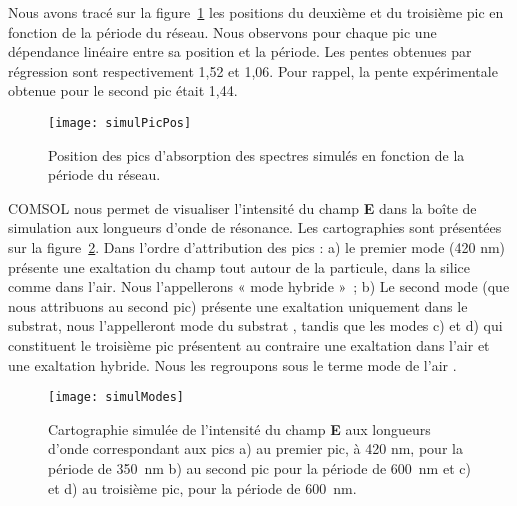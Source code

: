 Nous avons tracé sur la figure~\ref{simulPicPos} les positions du deuxième et du troisième pic en fonction de la période du réseau. Nous observons pour chaque pic une dépendance linéaire entre sa position et la période. Les pentes obtenues par régression sont respectivement 1,52 et 1,06. Pour rappel, la pente expérimentale obtenue pour le second pic était 1,44.\par 
\begin{figure}[!htb]
\centering
\texttt{[image: simulPicPos]}
\caption{Position des pics d'absorption des spectres simulés en fonction de la période du réseau.}
\label{simulPicPos}
\end{figure}

COMSOL nous permet de visualiser l'intensité du champ \textbf{E} dans la boîte de simulation aux longueurs d'onde de résonance. Les cartographies sont présentées sur la figure~\ref{simulModes}. Dans l'ordre d'attribution des pics : a) le premier mode (420 nm) présente une exaltation du champ tout autour de la particule, dans la silice comme dans l'air. Nous l'appellerons « mode hybride »~; b) Le second mode (que nous attribuons au second pic) présente une exaltation uniquement dans le substrat, nous l'appelleront \og mode du substrat \fg, tandis que les modes c) et d) qui constituent le troisième pic présentent au contraire une exaltation dans l'air et une exaltation hybride. Nous les regroupons sous le terme \og mode de l'air \fg.\par
\begin{figure}[!htb]
\centering
\texttt{[image: simulModes]}
\caption{Cartographie simulée de l'intensité du champ \textbf{E} aux longueurs d'onde correspondant aux pics a) au premier pic, à 420 nm, pour la période de 350~nm b) au second pic pour la période de 600~nm et c) et d) au troisième pic, pour la période de 600~nm.}
\label{simulModes}
\end{figure}

